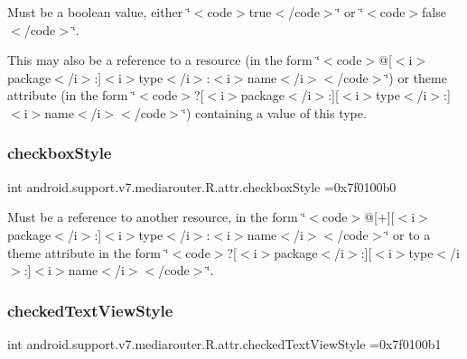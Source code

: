 Must be a boolean value, either \char`\"{}$<$code$>$true$<$/code$>$\char`\"{} or \char`\"{}$<$code$>$false$<$/code$>$\char`\"{}. 

This may also be a reference to a resource (in the form \char`\"{}$<$code$>$@\mbox{[}$<$i$>$package$<$/i$>$\+:\mbox{]}$<$i$>$type$<$/i$>$\+:$<$i$>$name$<$/i$>$$<$/code$>$\char`\"{}) or theme attribute (in the form \char`\"{}$<$code$>$?\mbox{[}$<$i$>$package$<$/i$>$\+:\mbox{]}\mbox{[}$<$i$>$type$<$/i$>$\+:\mbox{]}$<$i$>$name$<$/i$>$$<$/code$>$\char`\"{}) containing a value of this type. \mbox{\label{classandroid_1_1support_1_1v7_1_1mediarouter_1_1R_1_1attr_ae70108ea769d69866d5beea190485fb3}} 
\subsubsection{\texorpdfstring{checkbox\+Style}{checkboxStyle}}
{\footnotesize\ttfamily int android.\+support.\+v7.\+mediarouter.\+R.\+attr.\+checkbox\+Style =0x7f0100b0\hspace{0.3cm}{\ttfamily [static]}}

Must be a reference to another resource, in the form \char`\"{}$<$code$>$@\mbox{[}+\mbox{]}\mbox{[}$<$i$>$package$<$/i$>$\+:\mbox{]}$<$i$>$type$<$/i$>$\+:$<$i$>$name$<$/i$>$$<$/code$>$\char`\"{} or to a theme attribute in the form \char`\"{}$<$code$>$?\mbox{[}$<$i$>$package$<$/i$>$\+:\mbox{]}\mbox{[}$<$i$>$type$<$/i$>$\+:\mbox{]}$<$i$>$name$<$/i$>$$<$/code$>$\char`\"{}. \mbox{\label{classandroid_1_1support_1_1v7_1_1mediarouter_1_1R_1_1attr_a81e21989621264b9fcc0a28388fa3fa2}} 
\subsubsection{\texorpdfstring{checked\+Text\+View\+Style}{checkedTextViewStyle}}
{\footnotesize\ttfamily int android.\+support.\+v7.\+mediarouter.\+R.\+attr.\+checked\+Text\+View\+Style =0x7f0100b1\hspace{0.3cm}{\ttfamily [static]}}

